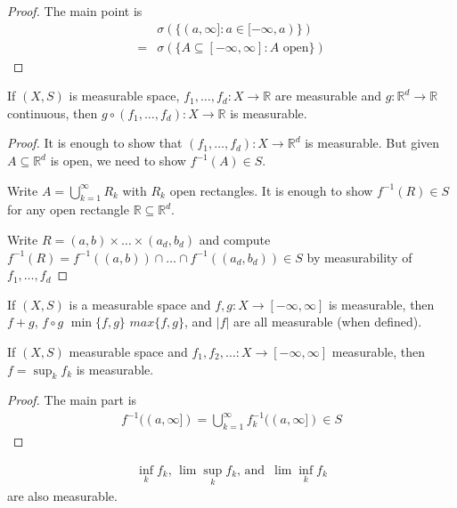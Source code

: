 \begin{proof}
	The main point is
	\begin{align*}
		&\sigma(\{(a,\infty] : a \in [-\infty, a)\}) \\
		= &\sigma(\{ A \subseteq [-\infty, \infty] : A \text{ open} \})
	\end{align*} 
\end{proof}

\begin{theorem}
	If $(X,S)$ is measurable space, 
	$f_1, \ldots, f_d : X \to \mathbb{R}$ are measurable and $g:\mathbb{R}^d \to \mathbb{R}$ continuous, then $g \circ (f_1, \ldots, f_d) : X \to \mathbb{R}$ is measurable.
\end{theorem}

\begin{proof}
	It is enough to show that $(f_1, \ldots, f_d) : X \to \mathbb{R}^d$ is measurable. But given $A \subseteq \mathbb{R}^d$ is open, we need to show $f^{-1}(A) \in S$.

	Write $A = \bigcup_{k=1}^{\infty} R_k$ with $R_k$ open rectangles. It is enough to show $f^{-1}(R) \in S$ for any open rectangle $\mathbb{R} \subseteq \mathbb{R}^d$.

	Write $R = (a,b) \times \ldots \times (a_d, b_d)$ and compute 
	$f^{-1}(R) =  f^{-1}((a,b)) \cap \ldots \cap f^{-1}((a_d, b_d)) \in S$
	by measurability of $f_1, \ldots , f_d$
\end{proof}

\begin{corollary}
	If $(X,S)$ is a measurable space and $f,g : X \to [-\infty, \infty]$ is measurable, 
	then $f+g$, $f\circ g$ $\min\{f,g\}$ $max\{f,g\}$, and $|f|$ are all measurable (when defined).
\end{corollary}

\begin{theorem}
	If $(X,S)$ measurable space and $f_1, f_2, \ldots : X \to [-\infty, \infty]$ measurable, then $f = \sup_k f_k$ is measurable.
\end{theorem}

\begin{proof}
	The main part is
	\begin{align*}
		f^{-1}((a, \infty]) = \bigcup_{k=1}^{\infty} f_k^{-1}((a,\infty]) \in S
	\end{align*}
\end{proof}

\begin{corollary}
	\begin{align*}
		\inf_k f_k, \, \lim \sup_k f_k, \, \text{and } \, \lim \inf_k f_k
	\end{align*} are also measurable.
\end{corollary}

